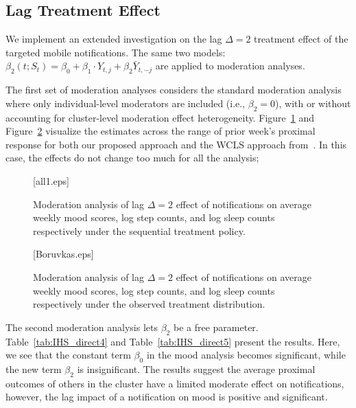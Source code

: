 \documentclass[supplementary, lineno]{biometrika}
\begin{document}
\subsection{Lag Treatment Effect}

We implement an extended investigation on the lag $\Delta=2$ treatment effect of the targeted mobile notifications. The same two models:
$\beta_{2}(t; S_t) = \beta_0 + \beta_1 \cdot Y_{t,j} + \beta_2 \bar Y_{t,-j}$ are applied to moderation analyses.

The first set of moderation analyses considers the standard moderation analysis where only individual-level moderators are included (i.e., $\beta_2 = 0$), with or without accounting for cluster-level moderation effect heterogeneity. Figure~\ref{fig:wcls_heterogeneity1} and Figure~\ref{fig:wcls_heterogeneity2} visualize the estimates across the range of prior week's proximal response for both our proposed approach and the WCLS approach from~\cite{Boruvkaetal}. In this case, the effects do not change too much for all the analysis;


\begin{figure}
  \figurebox{15pc}{20pc}{}[all1.eps]
  \caption{Moderation analysis of lag $\Delta=2$ effect of notifications on average weekly mood scores, log step counts, and log sleep counts respectively under the sequential treatment policy. }
  \label{fig:wcls_heterogeneity1}
\end{figure}


\begin{figure}
  \figurebox{15pc}{20pc}{}[Boruvkas.eps]
  \caption{Moderation analysis of lag $\Delta=2$ effect of notifications on average weekly mood scores, log step counts, and log sleep counts respectively under the observed treatment distribution. }
  \label{fig:wcls_heterogeneity2}
\end{figure}

The second moderation analysis lets $\beta_2$ be a free parameter.  Table~\ref{tab:IHS_direct4} and Table~\ref{tab:IHS_direct5} present the results.  Here, we see that the constant term $\beta_0$ in the mood analysis becomes significant, while the new term $\beta_2$ is insignificant.  The results suggest the average proximal outcomes of others in the cluster have a limited moderate effect on notifications, however, the lag impact of a notification on mood is positive and significant.  
\end{document}
